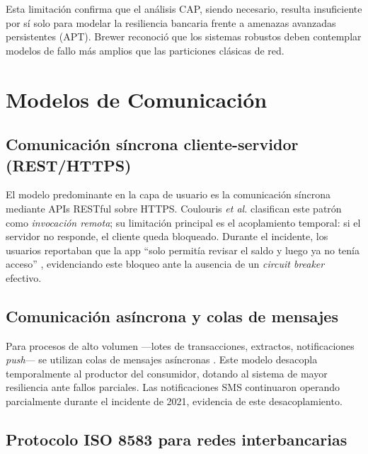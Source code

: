 \documentclass[12pt,a4paper]{article}
\begin{document}
Esta limitaci\'on confirma que el an\'alisis CAP, siendo necesario, resulta insuficiente por s\'i solo para modelar la resiliencia bancaria frente a amenazas avanzadas persistentes (APT). Brewer \cite{Brewer2000} reconoci\'o que los sistemas robustos deben contemplar modelos de fallo m\'as amplios que las particiones cl\'asicas de red.

\section{Modelos de Comunicaci\'on}

\subsection{Comunicaci\'on s\'incrona cliente-servidor (REST/HTTPS)}

El modelo predominante en la capa de usuario es la comunicaci\'on s\'incrona mediante APIs RESTful sobre HTTPS. Coulouris \textit{et al.} \cite{Coulouris2011} clasifican este patr\'on como \textit{invocaci\'on remota}; su limitaci\'on principal es el acoplamiento temporal: si el servidor no responde, el cliente queda bloqueado. Durante el incidente, los usuarios reportaban que la app ``solo permit\'ia revisar el saldo y luego ya no ten\'ia acceso'' \cite{ElUniverso2025}, evidenciando este bloqueo ante la ausencia de un \textit{circuit breaker} efectivo.

\subsection{Comunicaci\'on as\'incrona y colas de mensajes}

Para procesos de alto volumen ---lotes de transacciones, extractos, notificaciones \textit{push}--- se utilizan colas de mensajes as\'incronas \cite{DesignPatterns2024}. Este modelo desacopla temporalmente al productor del consumidor, dotando al sistema de mayor resiliencia ante fallos parciales. Las notificaciones SMS continuaron operando parcialmente durante el incidente de 2021, evidencia de este desacoplamiento.

\subsection{Protocolo ISO 8583 para redes interbancarias}
\end{document}
